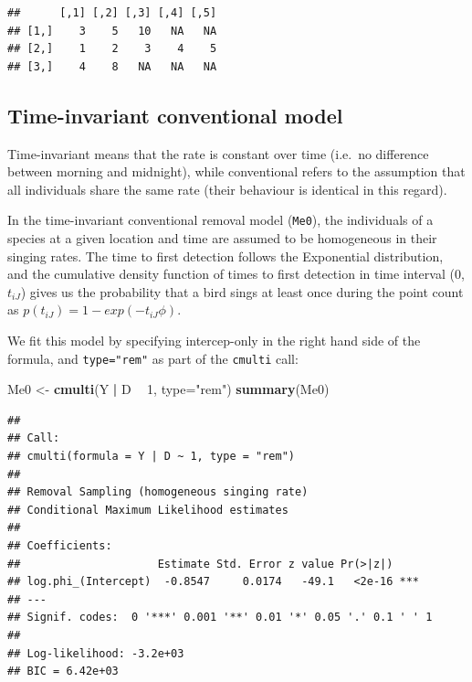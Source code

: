 \documentclass[12pt,]{book}
\newenvironment{Shaded}{\begin{snugshade}}{\end{snugshade}}
\newcommand{\DataTypeTok}[1]{\textcolor[rgb]{0.13,0.29,0.53}{#1}}
\newcommand{\DecValTok}[1]{\textcolor[rgb]{0.00,0.00,0.81}{#1}}
\newcommand{\KeywordTok}[1]{\textcolor[rgb]{0.13,0.29,0.53}{\textbf{#1}}}
\newcommand{\NormalTok}[1]{#1}
\newcommand{\OperatorTok}[1]{\textcolor[rgb]{0.81,0.36,0.00}{\textbf{#1}}}
\newcommand{\StringTok}[1]{\textcolor[rgb]{0.31,0.60,0.02}{#1}}
\begin{document}
\begin{verbatim}
##      [,1] [,2] [,3] [,4] [,5]
## [1,]    3    5   10   NA   NA
## [2,]    1    2    3    4    5
## [3,]    4    8   NA   NA   NA
\end{verbatim}

\hypertarget{time-invariant-conventional-model}{%
\subsection{Time-invariant conventional model}\label{time-invariant-conventional-model}}

Time-invariant means that the rate is constant over time
(i.e.~no difference between morning and midnight),
while conventional refers to the assumption
that all individuals share the same rate
(their behaviour is identical in this regard).

In the time-invariant conventional removal model (\texttt{Me0}),
the individuals of a species at a given location and time are assumed to be homogeneous
in their singing rates.
The time to first detection follows the Exponential distribution,
and the cumulative density function of times to first detection in time interval
(0, \(t_{iJ}\)) gives us the probability that a bird sings at least once during the point count as
\(p(t_{iJ}) = 1 - exp(-t_{iJ} \phi)\).

We fit this model by specifying intercep-only in the
right hand side of the formula, and \texttt{type="rem"}
as part of the \texttt{cmulti} call:

\begin{Shaded}
\begin{Highlighting}[]
\NormalTok{Me0 <-}\StringTok{ }\KeywordTok{cmulti}\NormalTok{(Y }\OperatorTok{|}\StringTok{ }\NormalTok{D }\OperatorTok{~}\StringTok{ }\DecValTok{1}\NormalTok{, }\DataTypeTok{type=}\StringTok{"rem"}\NormalTok{)}
\KeywordTok{summary}\NormalTok{(Me0)}
\end{Highlighting}
\end{Shaded}

\begin{verbatim}
## 
## Call:
## cmulti(formula = Y | D ~ 1, type = "rem")
## 
## Removal Sampling (homogeneous singing rate)
## Conditional Maximum Likelihood estimates
## 
## Coefficients:
##                     Estimate Std. Error z value Pr(>|z|)    
## log.phi_(Intercept)  -0.8547     0.0174   -49.1   <2e-16 ***
## ---
## Signif. codes:  0 '***' 0.001 '**' 0.01 '*' 0.05 '.' 0.1 ' ' 1 
## 
## Log-likelihood: -3.2e+03 
## BIC = 6.42e+03
\end{verbatim}
\end{document}
